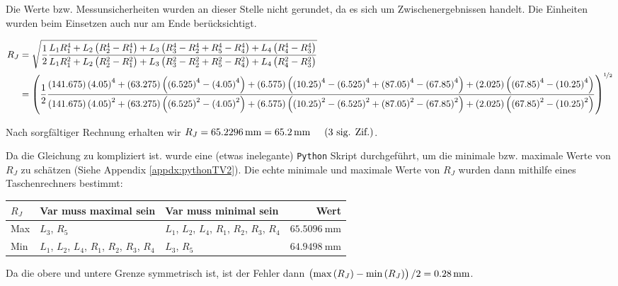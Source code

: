         Die Werte bzw. Messunsicherheiten wurden an dieser Stelle nicht gerundet, da es sich um Zwischenergebnissen handelt. Die Einheiten wurden beim Einsetzen auch nur am Ende berücksichtigt.

        \begin{minipage}[t][2cm][t]{1.1\textwidth}
            \tiny
            \vspace{-2em}
            \begin{align*}
                R_J &= \sqrt{\frac{1}{2}\frac{L_1R_1^4 + L_2\left(R_2^4-R_1^4\right) + L_3\left(R_3^4-R_2^4 + R_5^4-R_4^4\right) + L_4\left(R_4^4-R_3^4\right)}{L_1R_1^2 + L_2\left(R_2^2-R_1^2\right) + L_3\left(R_3^2-R_2^2 + R_5^2-R_4^2\right) + L_4\left(R_4^2-R_3^2\right)}} \\
                &= \left(\frac{1}{2}\frac{\left(\SI{141,675}{}\right)\left(\SI{4.05}{}\right)^4 + \left(\SI{63.275}{}\right)\left(\left(\SI{6.525}{}\right)^4-\left(\SI{4.05}{}\right)^4\right) + \left(\SI{6.575}{}\right)\left(\left(\SI{10.25}{}\right)^4-\left(\SI{6.525}{}\right)^4 + \left(\SI{87.05}{}\right)^4-\left(\SI{67.85}{}\right)^4\right) + \left(\SI{2.025}{}\right)\left(\left(\SI{67.85}{}\right)^4-\left(\SI{10.25}{}\right)^4\right)}{\left(\SI{141,675}{}\right)\left(\SI{4.05}{}\right)^2 + \left(\SI{63.275}{}\right)\left(\left(\SI{6.525}{}\right)^2-\left(\SI{4.05}{}\right)^2\right) + \left(\SI{6.575}{}\right)\left(\left(\SI{10.25}{}\right)^2-\left(\SI{6.525}{}\right)^2 + \left(\SI{87.05}{}\right)^2-\left(\SI{67.85}{}\right)^2\right) + \left(\SI{2.025}{}\right)\left(\left(\SI{67.85}{}\right)^2-\left(\SI{10.25}{}\right)^2\right)}\right)^{\nicefrac{1}{2}}
            \end{align*}
        \end{minipage}

        Nach sorgfältiger Rechnung erhalten wir $R_J = \SI{65.2296}{\milli\meter} = \SI{65.2}{\milli\meter} \hspace{0.5cm}\text{(3 sig. Zif.)}$.

        Da die Gleichung zu kompliziert ist. wurde eine (etwas inelegante) \texttt{Python} Skript durchgeführt, um die minimale bzw. maximale Werte von $R_J$ zu schätzen (Siehe Appendix \ref{appdx:pythonTV2}). Die echte minimale und maximale Werte von $R_J$ wurden dann mithilfe eines Taschenrechners bestimmt:
        \begin{center}
            \begin{tabular}{l ll r}
                \toprule
                $R_J$ & Var muss maximal sein & Var muss minimal sein & Wert \\
                \midrule
                Max & $L_3$, $R_5$ & $L_1$, $L_2$, $L_4$, $R_1$, $R_2$, $R_3$, $R_4$ & $\SI{65.5096}{\milli\meter}$\\
                Min & $L_1$, $L_2$, $L_4$, $R_1$, $R_2$, $R_3$, $R_4$ & $L_3$, $R_5$ & $\SI{64.9498}{\milli\meter}$\\
                \bottomrule
            \end{tabular}
        \end{center}
        Da die obere und untere Grenze symmetrisch ist, ist der Fehler dann $\left(\text{max}\left(R_J\right) - \text{min}\left(R_J\right)\right)/2 = \SI{0.28}{\milli\meter}$.

